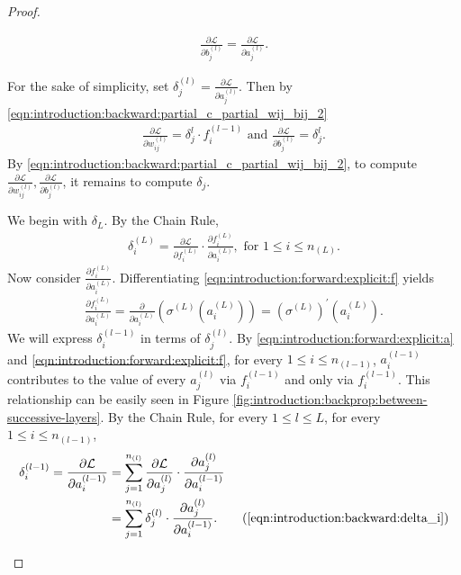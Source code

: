 \begin{proof}
\begin{step}
\begin{align}
    \frac{\partial \mathcal{L}}{\partial b_{j}^{(l)}} = \frac{\partial \mathcal{L}}{\partial a_{j}^{(l)}}.
\end{align}
\end{step}
For the sake of simplicity, set $\delta_j^{(l)} = \frac{\partial \mathcal{L}}{\partial a_{j}^{(l)}}$.
Then by \ref{eqn:introduction:backward:partial_c_partial_wij_bij_2}
\begin{align}
    \frac{\partial \mathcal{L}}{\partial w_{ij}^{(l)}} = \delta_j^{l} \cdot f_{i}^{(l-1)}  \text{ and }
    \frac{\partial \mathcal{L}}{\partial b_{j}^{(l)}}  = \delta_j^{l}.
\end{align}
By \ref{eqn:introduction:backward:partial_c_partial_wij_bij_2}, to compute $\frac{\partial \mathcal{L}}{\partial w_{ij}^{(l)}}, \frac{\partial \mathcal{L}}{\partial b_{j}^{(l)}}$, it remains to compute $\delta_j$.

\begin{step}
We begin with $\delta_L$. By the Chain Rule, \begin{align*}
    \delta_i ^{(L)} = \frac{\partial \mathcal{L}}{\partial f_{i}^{(L)}} \cdot \frac{\partial f_{i}^{(L)}}{\partial a_{i}^{(L)}}, \text{ for $1 \leq i \leq n_{(L)}$}.
\end{align*}
Now consider $\frac{\partial f_{i}^{(L)}}{\partial a_{i}^{(L)}}$. Differentiating \ref{eqn:introduction:forward:explicit:f} yields \begin{align}
    \frac{\partial f_{i}^{(L)}}{\partial a_{i}^{(L)}}= \frac{\partial}{\partial a_{i}^{(L)}} \left ( \sigma^{(L)}(a_{i}^{(L)}) \right ) =  (\sigma^{(L)})^{'}(a_{i}^{(L)}).
\end{align}
We will express $\delta_i^{(l-1)} $ in terms of $\delta_j^{(l)}$. By \ref{eqn:introduction:forward:explicit:a} and \ref{eqn:introduction:forward:explicit:f}, for every $1 \leq i \leq n_{(l-1)}$, $a_i^{(l - 1)}$ contributes to the value of every $a_j^{(l)}$ via $f_i^{(l-1)}$ and only via $f_i^{(l-1)}$. This relationship can be easily seen in Figure \ref{fig:introduction:backprop:between-successive-layers}. By the Chain Rule, for every  $1 \leq l \leq L$, for every $1 \leq i \leq n_{(l-1)}$, 
\begin{subequations}\label{eqn:introduction:backward:delta_i}
\begin{align*}
   \delta_i^{(l-1)} = \frac{\partial \mathcal{L}}{\partial a_{i}^{(l - 1)}} &= \sum_{j=1}^{n_{(l)}} \frac{\partial \mathcal{L}}{\partial a_{j}^{(l)}} \cdot \frac{\partial a_{j}^{(l)}}{\partial a_{i}^{(l-1)}} \\  &= \sum_{j=1}^{n_{(l)}} \delta_j^{(l)}   \cdot \frac{\partial a_{j}^{(l)}}{\partial a_{i}^{(l-1)}}. \tag{\ref{eqn:introduction:backward:delta_i}}
\end{align*}
\end{subequations}


\end{step}
\end{proof}
